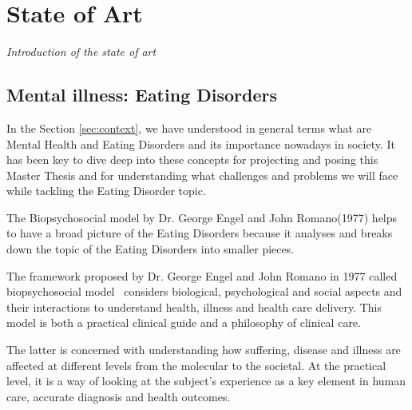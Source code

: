 \chapter{State of Art}
\label{chap:state-of-art}
\textit{Introduction of the state of art}

\clearpage
\section{Mental illness: Eating Disorders}

In the Section \ref{sec:context}, we have understood in general terms what are Mental Health and Eating Disorders and its importance nowadays in society. It has been key to dive deep into these concepts for projecting and posing this Master Thesis and for understanding what challenges and problems we will face while tackling the Eating Disorder topic.

The Biopsychosocial model by Dr. George Engel and John Romano(1977) helps to have a broad picture of the Eating Disorders because it analyses and breaks down the topic of the Eating Disorders into smaller pieces.


The framework proposed by Dr. George Engel and John Romano in 1977 called biopsychosocial model~\cite{WhatisBi40:online} considers biological, psychological and social aspects and their interactions to understand health, illness and health care delivery. This model is both a practical clinical guide and a philosophy of clinical care. 

The latter is concerned with understanding how suffering, disease and illness are affected at different levels from the molecular to the societal. At the practical level, it is a way of looking at the subject's experience as a key element in human care, accurate diagnosis and health outcomes.%

